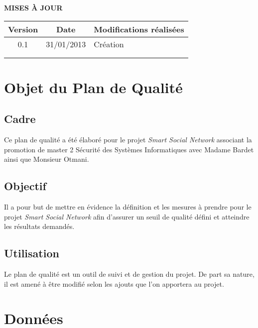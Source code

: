 \documentclass[a4paper,11pt,french]{article}
\begin{document}
\makeFirstPage
\clearpage

\vspace*{1cm}
\begin{center}
\textbf{\huge{MISES À JOUR}}\\
\vspace*{3cm}
	\begin{tabularx}{16cm}{|c|c|X|}
	\hline
	\bfseries{Version} & \bfseries{Date} & \bfseries{Modifications réalisées}\\
	\hline
	0.1 & 31/01/2013 & Création\\
	\hline
	&&\\
	\hline
	&&\\
	\hline
	\end{tabularx}
\end{center}

\clearpage
\tableofcontents
\clearpage

\renewcommand\labelitemi{\textbullet} %
\renewcommand\labelitemii{$\circ$} %
\section{Objet du Plan de Qualité}
\subsection{Cadre}
	Ce plan de qualité a été élaboré pour le projet \emph{Smart Social
Network} associant la promotion de master 2 Sécurité des Systèmes
Informatiques avec Madame Bardet ainsi que Monsieur Otmani.

\subsection{Objectif}
	Il a pour but de mettre en évidence la définition et les mesures à
prendre pour le projet \emph{Smart Social Network} afin d'assurer un seuil de
qualité défini et atteindre les résultats demandés.

\subsection{Utilisation}
	Le plan de qualité est un outil de suivi et de gestion du projet.
De part sa nature, il est amené à être modifié selon les ajouts que l'on
apportera au projet.

\section{Données}
\end{document}

